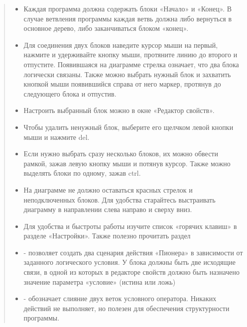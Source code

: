 \documentclass[a4paper,10pt,russian]{sphinxmanual}
\begin{document}
\begin{quote}
\begin{itemize}
\item {} 
Каждая программа должна содержать блоки «Начало» и «Конец». В случае ветвления программы каждая ветвь должна либо вернуться в основное дерево, либо заканчиваться блоком «конец».

\item {} 
Для соединения двух блоков наведите курсор мыши на первый, нажмите и удерживайте  кнопку мыши, протяните линию до второго и отпустите. Появившаяся на диаграмме стрелка означает, что два блока логически связаны. Также можно выбрать нужный блок и захватить  кнопкой мыши появившийся справа от него маркер, протянув до следующего блока и отпустив.

\item {} 
Настроить выбранный блок можно в окне «Редактор свойств».

\item {} 
Чтобы удалить ненужный блок, выберите его щелчком левой кнопки мыши и нажмите del.

\item {} 
Если нужно выбрать сразу несколько блоков, их можно обвести рамкой, зажав левую кнопку мыши и потянув курсор. Также можно выделять блоки по одному, зажав ctrl.

\item {} 
На диаграмме не должно оставаться красных стрелок и неподключенных блоков. Для удобства старайтесь выстраивать диаграмму в направлении слева направо и сверху вниз.

\item {} 
Для удобства и быстроты работы изучите список «горячих клавиш» в разделе «Настройки». Также полезно прочитать раздел 

\end{itemize}

\begin{itemize}
\item {} 
 - позволяет создать два сценария действия «Пионера» в зависимости от заданного логического условия. У блока должны быть две исходящие связи, в одной из которых в редакторе свойств должно быть назначено значение параметра «условие» (истина или ложь)

\item {} 
 - обозначает слияние двух веток условного оператора. Никаких действий не выполняет, но полезен для обеспечения структурности программы.


\end{itemize}
\end{quote}
\end{document}
